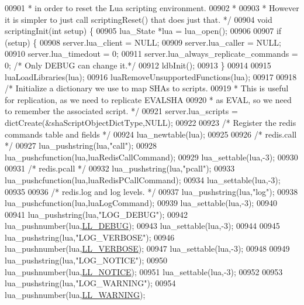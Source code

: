 \begin{DoxyCode}
{{{{{{{{00901 \textcolor{comment}{ * in order to reset the Lua scripting environment.}
00902 \textcolor{comment}{ *}
00903 \textcolor{comment}{ * However it is simpler to just call scriptingReset() that does just that. */}
00904 \textcolor{keywordtype}{void} scriptingInit(\textcolor{keywordtype}{int} setup) \{
00905     lua\_State *lua = lua\_open();
00906 
00907     \textcolor{keywordflow}{if} (setup) \{
00908         server.lua\_client = NULL;
00909         server.lua\_caller = NULL;
00910         server.lua\_timedout = 0;
00911         server.lua\_always\_replicate\_commands = 0; \textcolor{comment}{/* Only DEBUG can change it.*/}
00912         ldbInit();
00913     \}
00914 
00915     luaLoadLibraries(lua);
00916     luaRemoveUnsupportedFunctions(lua);
00917 
00918     \textcolor{comment}{/* Initialize a dictionary we use to map SHAs to scripts.}
00919 \textcolor{comment}{     * This is useful for replication, as we need to replicate EVALSHA}
00920 \textcolor{comment}{     * as EVAL, so we need to remember the associated script. */}
00921     server.lua\_scripts = dictCreate(&shaScriptObjectDictType,NULL);
00922 
00923     \textcolor{comment}{/* Register the redis commands table and fields */}
00924     lua\_newtable(lua);
00925 
00926     \textcolor{comment}{/* redis.call */}
00927     lua\_pushstring(lua,\textcolor{stringliteral}{"call"});
00928     lua\_pushcfunction(lua,luaRedisCallCommand);
00929     lua\_settable(lua,-3);
00930 
00931     \textcolor{comment}{/* redis.pcall */}
00932     lua\_pushstring(lua,\textcolor{stringliteral}{"pcall"});
00933     lua\_pushcfunction(lua,luaRedisPCallCommand);
00934     lua\_settable(lua,-3);
00935 
00936     \textcolor{comment}{/* redis.log and log levels. */}
00937     lua\_pushstring(lua,\textcolor{stringliteral}{"log"});
00938     lua\_pushcfunction(lua,luaLogCommand);
00939     lua\_settable(lua,-3);
00940 
00941     lua\_pushstring(lua,\textcolor{stringliteral}{"LOG\_DEBUG"});
00942     lua\_pushnumber(lua,\hyperlink{server_8h_abcaffe365dee628fcf9fc90c69d534a1}{LL\_DEBUG});
00943     lua\_settable(lua,-3);
00944 
00945     lua\_pushstring(lua,\textcolor{stringliteral}{"LOG\_VERBOSE"});
00946     lua\_pushnumber(lua,\hyperlink{server_8h_a479b60032f8da6d8ad72e1a9d0809950}{LL\_VERBOSE});
00947     lua\_settable(lua,-3);
00948 
00949     lua\_pushstring(lua,\textcolor{stringliteral}{"LOG\_NOTICE"});
00950     lua\_pushnumber(lua,\hyperlink{server_8h_a8c54c191e436c7dd3012167212692401}{LL\_NOTICE});
00951     lua\_settable(lua,-3);
00952 
00953     lua\_pushstring(lua,\textcolor{stringliteral}{"LOG\_WARNING"});
00954     lua\_pushnumber(lua,\hyperlink{server_8h_a31229b9334bba7d6be2a72970967a14b}{LL\_WARNING});
}}}}}}}}
\end{DoxyCode}
